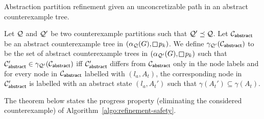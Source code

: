 \begin{algorithm}[b]

\caption{Abstraction partition refinement given an unconcretizable path in an  abstract counterexample tree.}
\label{algo:refinement-safety}

\end{algorithm}

Let $\mathcal{Q}$ and $\mathcal{Q}'$ be two counterexample partitions such that $\mathcal{Q}' \preceq \mathcal{Q}$. Let $\mathcal{C}_{\mathsf{abstract}}$ be an abstract counterexample  tree in $(\alpha_\part(G),\LTLglobally p_k)$. We define $\gamma_{\mathcal{Q}'}(\mathcal{C}_{\mathsf{abstract}})$ to be the set of abstract counterexample trees in $(\alpha_{\part'}(G),\LTLglobally p_k)$ such that $\mathcal{C}'_{\mathsf{abstract}} \in \gamma_{\mathcal{Q}'}(\mathcal{C}_{\mathsf{abstract}})$ iff $\mathcal{C}'_{\mathsf{abstract}}$ differs from $\mathcal{C}_{\mathsf{abstract}}$ only in the node labels and for every node in $\mathcal{C}_{\mathsf{abstract}}$ labelled with $(l_a,A_t)$, the corresponding node in $\mathcal{C}'_{\mathsf{abstract}}$ is labelled with an abstract state $(l_a,A_t')$ such that $\gamma(A_t') \subseteq \gamma(A_t)$.
 
The theorem below states the progress property (eliminating the considered counterexample) of Algorithm~\ref{algo:refinement-safety}.

